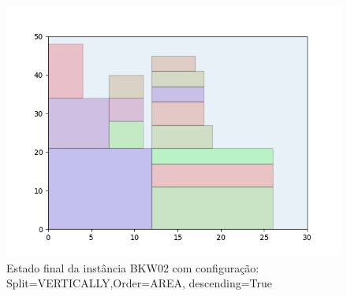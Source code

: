 \begin{figure}[H]
    \centering
    \caption[]{Estado final da instância BKW02 com configuração: Split=VERTICALLY,Order=AREA, descending=True}
    \label{fig:bkw02-vertically-area-true}
    \includegraphics[scale=0.5]{output/figures/bkw/bkw02/vertically/area/true/00}
\end{figure}